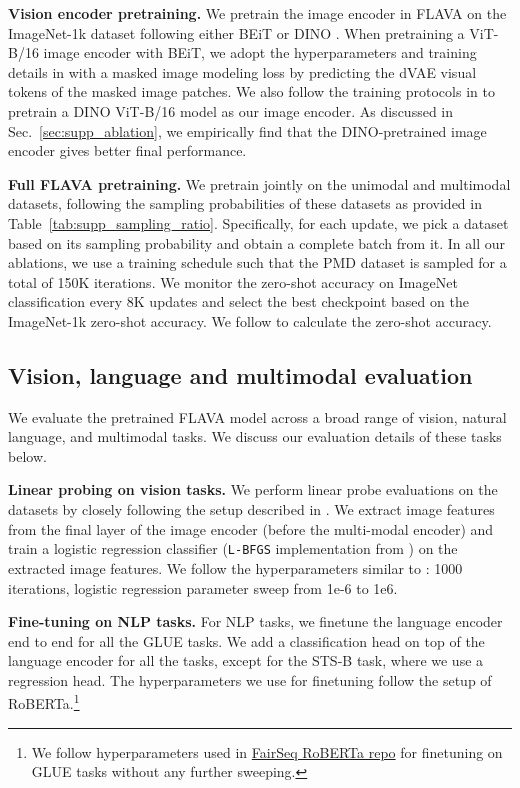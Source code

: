 \documentclass[10pt,twocolumn,letterpaper]{article}
\newcommand{\myparagraph}[1]{\vspace{0.25em}\noindent\textbf{#1}}
\begin{document}
\myparagraph{Vision encoder pretraining.} We pretrain the image encoder in FLAVA on the ImageNet-1k dataset following either BEiT \cite{bao2021beit} or DINO \cite{caron2021emerging}. When pretraining a ViT-B/16 image encoder with BEiT, we adopt the hyperparameters and training details in \cite{bao2021beit} with a masked image modeling loss by predicting the dVAE visual tokens of the masked image patches. We also follow the training protocols in \cite{caron2021emerging} to pretrain a DINO ViT-B/16 model as our image encoder. As discussed in Sec.~\ref{sec:supp_ablation}, we empirically find that the DINO-pretrained image encoder gives better final performance.

\myparagraph{Full FLAVA pretraining.} We pretrain jointly on the unimodal and multimodal datasets, following the sampling probabilities of these datasets as provided in Table~\ref{tab:supp_sampling_ratio}. Specifically, for each update, we pick a dataset based on its sampling probability and obtain a complete batch from it. In all our ablations, we use a training schedule such that the PMD dataset is sampled for a total of 150K iterations. We monitor the zero-shot accuracy on ImageNet classification \cite{imagenet} every 8K updates and select the best checkpoint based on the ImageNet-1k zero-shot accuracy. We follow \cite{radford2021learning} to calculate the zero-shot accuracy.

\subsection{Vision, language and multimodal evaluation}

We evaluate the pretrained FLAVA model across a broad range of vision, natural language, and multimodal tasks. We discuss our evaluation details of these tasks below.

\myparagraph{Linear probing on vision tasks.} We perform linear probe evaluations on the datasets by closely following the setup described in \cite{radford2021learning}. We extract image features from the final layer of the image encoder (before the multi-modal encoder) and train a logistic regression classifier (\texttt{L-BFGS} implementation from \cite{scikit-learn}) on the extracted image features. We follow the hyperparameters similar to \cite{radford2021learning} : 1000 iterations, logistic regression  parameter sweep from 1e-6 to 1e6.

\myparagraph{Fine-tuning on NLP tasks.} For NLP tasks, we finetune the language encoder end to end for all the GLUE tasks. We add a classification head on top of the language encoder for all the tasks, except for the STS-B task, where we use a regression head. The hyperparameters we use for finetuning follow the setup of RoBERTa\cite{liu2019roberta}.\footnote{We follow hyperparameters used in \href{https://github.com/pytorch/fairseq/tree/main/examples/roberta}{FairSeq RoBERTa repo} for finetuning on GLUE tasks without any further sweeping.}
\end{document}
